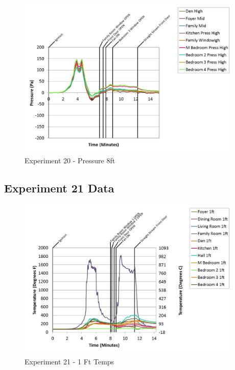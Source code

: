 \documentclass{article}
\begin{document}
\begin{appendices}
	\clearpage

	\begin{figure}[h!]
		\centering
		\includegraphics[height=3.05in]{0_Images/Results_Charts/Exp_20_Charts/Pressure8ft.pdf}
		\caption{Experiment 20 - Pressure 8ft}
	\end{figure}
 

		\clearpage
\clearpage		\large
\subsection{Experiment 21 Data} \label{App:Exp21Results} 

	\begin{figure}[h!]
		\centering
		\includegraphics[height=3.05in]{0_Images/Results_Charts/Exp_21_Charts/1FtTemps.pdf}
		\caption{Experiment 21 - 1 Ft Temps}
	\end{figure}
 


\end{appendices}
\end{document}
